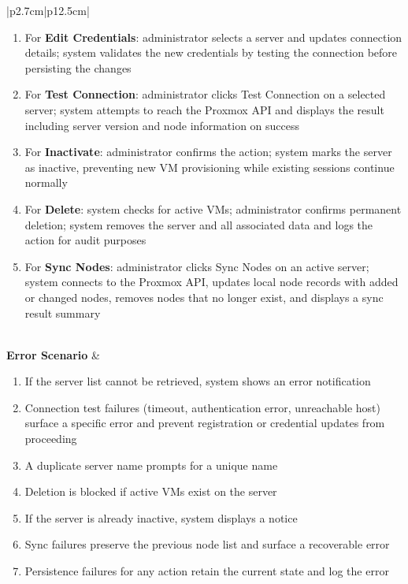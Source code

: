 \begin{table}[H]
\begin{tabular}{|p{2.7cm}|p{12.5cm}|}
\begin{minipage}[t]{\linewidth}
\begin{enumerate}[topsep=0pt,itemsep=1pt,parsep=0pt,partopsep=0pt]
                \item For \textbf{Edit Credentials}: administrator selects a server and updates connection details; system validates the new credentials by testing the connection before persisting the changes
                \item For \textbf{Test Connection}: administrator clicks Test Connection on a selected server; system attempts to reach the Proxmox API and displays the result including server version and node information on success
                \item For \textbf{Inactivate}: administrator confirms the action; system marks the server as inactive, preventing new VM provisioning while existing sessions continue normally
                \item For \textbf{Delete}: system checks for active VMs; administrator confirms permanent deletion; system removes the server and all associated data and logs the action for audit purposes
                \item For \textbf{Sync Nodes}: administrator clicks Sync Nodes on an active server; system connects to the Proxmox API, updates local node records with added or changed nodes, removes nodes that no longer exist, and displays a sync result summary
            \end{enumerate}
        \end{minipage} \\
        \hline
        \textbf{Error Scenario} & \begin{minipage}[t]{\linewidth}
            \begin{enumerate}[topsep=0pt,itemsep=1pt,parsep=0pt,partopsep=0pt]
                \item If the server list cannot be retrieved, system shows an error notification
                \item Connection test failures (timeout, authentication error, unreachable host) surface a specific error and prevent registration or credential updates from proceeding
                \item A duplicate server name prompts for a unique name
                \item Deletion is blocked if active VMs exist on the server
                \item If the server is already inactive, system displays a notice
                \item Sync failures preserve the previous node list and surface a recoverable error
                \item Persistence failures for any action retain the current state and log the error
            \end{enumerate}
        \end{minipage} \\
        \hline
    \end{tabular}
    \label{tab:admin-manage-proxmox}
\end{table}

